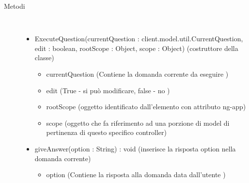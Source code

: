 \begin{description}
\item[Metodi] \hfill \\
 \vspace{-7mm}
\begin{itemize}
\item ExecuteQuestion(currentQuestion : client.model.util.CurrentQuestion, edit : boolean, rootScope : Object, scope : Object) (costruttore della classe)\begin{itemize}
\item currentQuestion (Contiene la domanda corrente da eseguire )
\item edit (True - si può modificare, false - no )
\item rootScope (oggetto identificato dall’elemento con attributo ng-app)
\item scope (oggetto che fa riferimento ad una porzione di model di pertinenza di questo specifico controller)
\end{itemize}

\item giveAnswer(option : String) : void (inserisce la risposta option nella domanda corrente)\begin{itemize}
\item option (Contiene la risposta alla domanda  data dall'utente )
\end{itemize}

\end{itemize}

\end{description}

